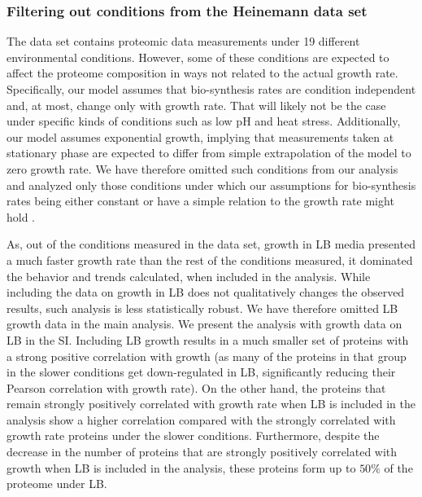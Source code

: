 \subsubsection{Filtering out conditions from the Heinemann data set}
\label{heinemanncond} 

The \cite{Heinemann2015} data set contains proteomic data measurements under 19 different environmental conditions.
However, some of these conditions are expected to affect the proteome composition in ways not related to the actual growth rate.
Specifically, our model assumes that bio-synthesis rates are condition independent and, at most, change only with growth rate.
That will likely not be the case under specific kinds of conditions such as low pH and heat stress.
Additionally, our model assumes exponential growth, implying that measurements taken at stationary phase are expected to differ from simple extrapolation of the model to zero growth rate.
We have therefore omitted such conditions from our analysis and analyzed only those conditions under which our assumptions for bio-synthesis rates being either constant or have a simple relation to the growth rate might hold .

As, out of the conditions measured in the \cite{Heinemann2015} data set, growth in LB media presented a much faster growth rate than the rest of the conditions measured, it dominated the behavior and trends calculated, when included in the analysis.
While including the data on growth in LB does not qualitatively changes the observed results, such analysis is less statistically robust.
We have therefore omitted LB growth data in the main analysis.
We present the analysis with growth data on LB in the SI.
Including LB growth results in a much smaller set of proteins with a strong positive correlation with growth (as many of the proteins in that group in the slower conditions get down-regulated in LB, significantly reducing their Pearson correlation with growth rate).
On the other hand, the proteins that remain strongly positively correlated with growth rate when LB is included in the analysis show a higher correlation compared with the strongly correlated with growth rate proteins under the slower conditions.
Furthermore, despite the decrease in the number of proteins that are strongly positively correlated with growth when LB is included in the analysis, these proteins form up to $50\%$ of the proteome under LB.